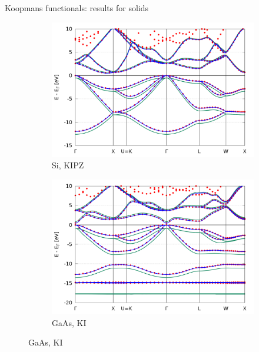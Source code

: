 \documentclass[xcolor=table,aspectratio=169]{beamer}
\numberwithin{equation}{section}
\begin{document}
\begin{frame}{Koopmans functionals: results for solids}
   \vspace{-0.5em}
   \begin{figure}[t]
      \centering
      \begin{subfigure}{0.45\textwidth}
         \includegraphics[width=\columnwidth]{figures/Si_kipz_bands.png}
         \caption{Si, KIPZ}
      \end{subfigure}
      \begin{subfigure}{0.45\textwidth}
         \includegraphics[width=\columnwidth]{figures/GaAs_ki_bands.png}
         \caption{GaAs, KI}
      \end{subfigure}

\end{figure}
\end{frame}
\end{document}
